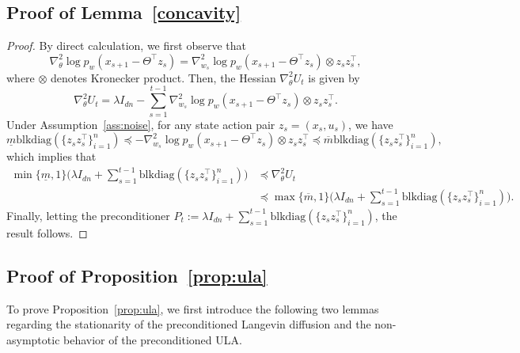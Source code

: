 \documentclass[11pt]{article}
\theoremstyle{plain}
\theoremstyle{definition}
\theoremstyle{remark}
\begin{document}
\subsection{Proof of Lemma~\ref{concavity}}\label{app:sec_a}
\begin{proof}
By direct calculation, we first observe that
\begin{equation*}
    \nabla^2_{\theta} \log p_w(x_{s+1}-\Theta^\top z_s) = \nabla^2_{w_s} \log p_w(x_{s+1}-\Theta^\top z_s) \otimes z_s z_s^{\top},
\end{equation*}
where $\otimes$ denotes Kronecker product.
Then, the Hessian $\nabla^2_{\theta}U_t$ is given by 
\begin{equation*}
    \nabla^2_{\theta}U_t = \lambda I_{dn} - \sum_{s=1}^{t-1}\nabla^2_{w_s} \log p_w(x_{s+1}-\Theta^\top z_s) \otimes z_s z_s^{\top}.
\end{equation*} 
Under Assumption~\ref{ass:noise}, for any state action pair $z_s=(x_s,u_s)$, we have
\begin{equation*}
  \underline m\text{blkdiag}(\{ z_s z_s^{\top}\}_{i=1}^{n})   \preceq -\nabla^2_{w_s} \log p_w(x_{s+1}-\Theta^\top z_s) \otimes z_s z_s^{\top} \preceq \overline m \text{blkdiag}(\{z_s z_s^{\top}\}_{i=1}^{n}),
\end{equation*}
which implies that
\begin{equation*}
\begin{split}
   \min\{ \underline m, 1\}\bigg( \lambda I_{dn}+\sum_{s=1}^{t-1}\text{blkdiag}(\{z_s z_s^{\top}\}_{i=1}^{n})\bigg) &\preceq  \nabla^2_{\theta}U_t\\
   &\preceq \max\{ \overline m, 1\}\bigg( \lambda I_{dn}+\sum_{s=1}^{t-1}\text{blkdiag}(\{z_s z_s^{\top}\}_{i=1}^{n})\bigg). 
   \end{split}
   \end{equation*}
Finally, letting the preconditioner $P_t := \lambda I_{dn} +\sum_{s=1}^{t-1}\text{blkdiag}(\{z_s z_s^{\top}\}_{i=1}^{n})$, the result follows.
\end{proof}


\subsection{Proof of Proposition~\ref{prop:ula}}
\label{app:prop:ula}

To prove Proposition~\ref{prop:ula}, we first introduce the following two lemmas regarding the stationarity of the preconditioned Langevin diffusion and the non-asymptotic behavior of the preconditioned ULA. 
\end{document}
